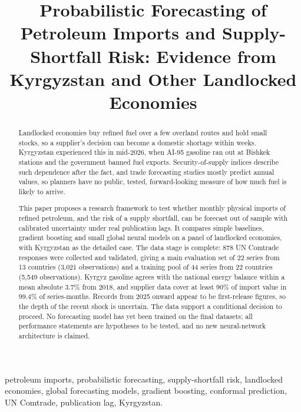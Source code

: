\documentclass[conference]{IEEEtran}
\begin{document}
\title{Probabilistic Forecasting of Petroleum Imports and Supply-Shortfall Risk: Evidence from Kyrgyzstan and Other Landlocked Economies}

\author{
}

\maketitle

\begin{abstract}
Landlocked economies buy refined fuel over a few overland routes and hold small stocks, so a supplier's decision can become a domestic shortage within weeks. Kyrgyzstan experienced this in mid-2026, when AI-95 gasoline ran out at Bishkek stations and the government banned fuel exports. Security-of-supply indices describe such dependence after the fact, and trade forecasting studies mostly predict annual values, so planners have no public, tested, forward-looking measure of how much fuel is likely to arrive.

This paper proposes a research framework to test whether monthly physical imports of refined petroleum, and the risk of a supply shortfall, can be forecast out of sample with calibrated uncertainty under real publication lags. It compares simple baselines, gradient boosting and small global neural models on a panel of landlocked economies, with Kyrgyzstan as the detailed case. The data stage is complete: 878 UN Comtrade responses were collected and validated, giving a main evaluation set of 22 series from 13 countries (3,021 observations) and a training pool of 44 series from 22 countries (5,549 observations). Kyrgyz gasoline agrees with the national energy balance within a mean absolute 3.7\% from 2018, and supplier data cover at least 90\% of import value in 99.4\% of series-months. Records from 2025 onward appear to be first-release figures, so the depth of the recent shock is uncertain. The data support a conditional decision to proceed. No forecasting model has yet been trained on the final datasets; all performance statements are hypotheses to be tested, and no new neural-network architecture is claimed.
\end{abstract}

\begin{IEEEkeywords}
petroleum imports, probabilistic forecasting, supply-shortfall risk, landlocked economies, global forecasting models, gradient boosting, conformal prediction, UN Comtrade, publication lag, Kyrgyzstan.
\end{IEEEkeywords}
\end{document}
